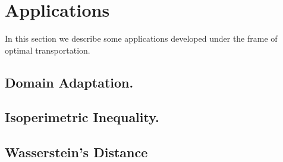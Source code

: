 \chapter{Applications}
In this section we describe some applications developed under the frame of optimal transportation.
\section{Domain Adaptation.}
\section{Isoperimetric Inequality.}
\section{Wasserstein's Distance}
